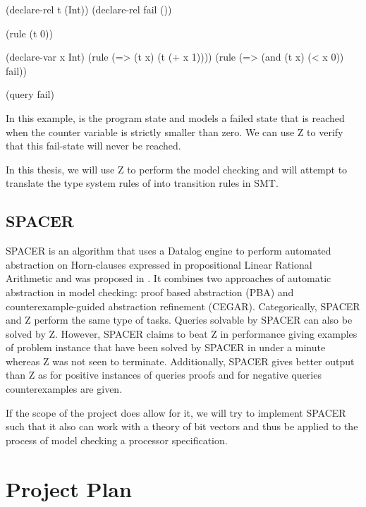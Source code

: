 \documentclass{securem}
\newcommand{\muZ}{{\textmu}Z}
\begin{document}
\begin{smt2}
(declare-rel t (Int))
(declare-rel fail ())

(rule (t 0))

(declare-var x Int)
(rule   (=> (t x)
            (t (+ x 1))))
(rule   (=> (and (t x) (< x 0))
            fail))

(query fail)
\end{smt2}

In this example,  is the program state and  models a failed state that is reached when the counter variable is strictly smaller than zero.
We can use \muZ{} to verify that this fail-state will never be reached.

In this thesis, we will use \muZ{} to perform the model checking and will attempt to translate the type system rules of \cite{Ferraiuolo17} into transition rules in SMT.

\subsection{SPACER}

SPACER is an algorithm that uses a Datalog engine to perform automated abstraction on Horn-clauses expressed in propositional Linear Rational Arithmetic and was proposed in \cite{Komuravelli13}.
It combines two approaches of automatic abstraction in model checking: proof based abstraction (PBA) and counterexample-guided abstraction refinement (CEGAR).
Categorically, SPACER and \muZ{} perform the same type of tasks.
Queries solvable by SPACER can also be solved by \muZ{}.
However, SPACER claims to beat \muZ{} in performance giving examples of problem instance that have been solved by SPACER in under a minute whereas \muZ{} was not seen to terminate.
Additionally, SPACER gives better output than \muZ{} as for positive instances of queries proofs and for negative queries counterexamples are given.

If the scope of the project does allow for it, we will try to implement SPACER such that it also can work with a theory of bit vectors and thus be applied to the process of model checking a processor specification.

\section{Project Plan}
\end{document}
